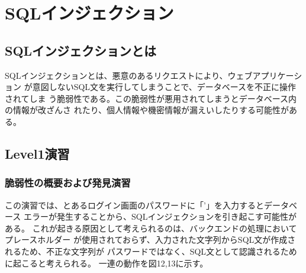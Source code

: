 \documentclass[dvipdfmx,autodetect-engine,titlepage]{jsarticle}
\begin{document}
\section{SQLインジェクション}

\subsection{SQLインジェクションとは}
SQLインジェクションとは、悪意のあるリクエストにより、ウェブアプリケーション
が意図しないSQL文を実行してしまうことで、データベースを不正に操作されてしま
う脆弱性である。この脆弱性が悪用されてしまうとデータベース内の情報が改ざんさ
れたり、個人情報や機密情報が漏えいしたりする可能性がある。

\subsection{Level1演習}

\subsubsection*{脆弱性の概要および発見演習}
この演習では、とあるログイン画面のパスワードに「'」を入力するとデータベース
エラーが発生することから、SQLインジェクションを引き起こす可能性がある。
これが起きる原因として考えられるのは、バックエンドの処理においてプレースホルダー
が使用されておらず、入力された文字列からSQL文が作成されるため、不正な文字列が
パスワードではなく、SQL文として認識されるために起こると考えられる。
一連の動作を図12,13に示す。\\
\end{document}
